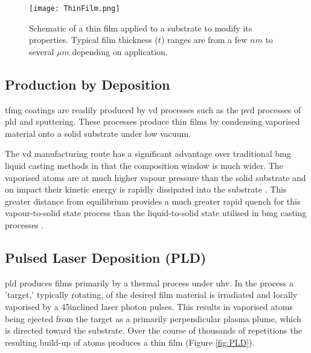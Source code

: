 \documentclass[a4paper,12pt,oneside]{report}%
\begin{document}
\begin{figure}[htbp]
	\centering
	\texttt{[image: ThinFilm.png]}
	\caption[Schematic of a thin film applied to a substrate to modify its properties. Typical film thickness ($t$) ranges are from a few $nm$ to several $\mu m$ depending on application.]{Schematic of a thin film applied to a substrate to modify its properties. Typical film thickness ($t$) ranges are from a few $nm$ to several $\mu m$ depending on application.}
	\label{fig:ThinFilm}
\end{figure}

\subsection{Production by Deposition}
\Gls{tfmg} coatings are readily produced by \gls{vd} processes such as the \gls{pvd} processes of \gls{pld} and sputtering. These processes produce thin films by condensing vaporised material onto a solid substrate under low vacuum. 

The \gls{vd} manufacturing route has a significant advantage over traditional \gls{bmg} liquid casting methods in that the composition window is much wider. The vaporised atoms are at much higher vapour pressure than the solid substrate and on impact their kinetic energy is rapidly dissipated into the substrate \cite{Ishii2014}. This greater distance from equilibrium provides a much greater rapid quench for this vapour-to-solid state process than the liquid-to-solid state utilised in \gls{bmg} casting processes \cite{Chu2012b}. 

\subsection{Pulsed Laser Deposition (PLD)}
\Acrfull{pld} produces films primarily by a thermal process under \gls{uhv}. In the process a 'target,' typically rotating, of the desired film material is irradiated and locally vaporised by a 45\degree inclined laser photon pulses. This results in vaporised atoms being ejected from the target as a primarily perpendicular plasma plume, which is directed toward the substrate. Over the course of thousands of repetitions the resulting build-up of atoms produces a thin film (Figure \ref{fig:PLD}). 
\end{document}
